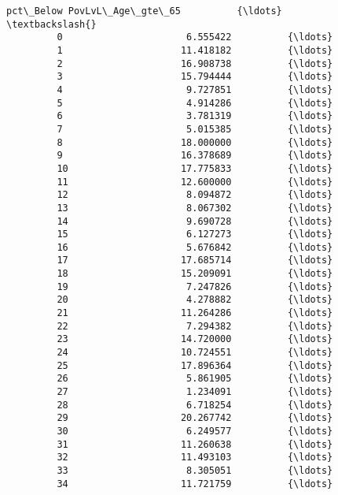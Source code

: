 \documentclass[11pt]{article}
\begin{document}
\begin{Verbatim}[commandchars=\\\{\}]
             pct\_Below PovLvL\_Age\_gte\_65          {\ldots}            \textbackslash{}
         0                      6.555422          {\ldots}             
         1                     11.418182          {\ldots}             
         2                     16.908738          {\ldots}             
         3                     15.794444          {\ldots}             
         4                      9.727851          {\ldots}             
         5                      4.914286          {\ldots}             
         6                      3.781319          {\ldots}             
         7                      5.015385          {\ldots}             
         8                     18.000000          {\ldots}             
         9                     16.378689          {\ldots}             
         10                    17.775833          {\ldots}             
         11                    12.600000          {\ldots}             
         12                     8.094872          {\ldots}             
         13                     8.067302          {\ldots}             
         14                     9.690728          {\ldots}             
         15                     6.127273          {\ldots}             
         16                     5.676842          {\ldots}             
         17                    17.685714          {\ldots}             
         18                    15.209091          {\ldots}             
         19                     7.247826          {\ldots}             
         20                     4.278882          {\ldots}             
         21                    11.264286          {\ldots}             
         22                     7.294382          {\ldots}             
         23                    14.720000          {\ldots}             
         24                    10.724551          {\ldots}             
         25                    17.896364          {\ldots}             
         26                     5.861905          {\ldots}             
         27                     1.234091          {\ldots}             
         28                     6.718254          {\ldots}             
         29                    20.267742          {\ldots}             
         30                     6.249577          {\ldots}             
         31                    11.260638          {\ldots}             
         32                    11.493103          {\ldots}             
         33                     8.305051          {\ldots}             
         34                    11.721759          {\ldots}             

\end{Verbatim}
\end{document}
